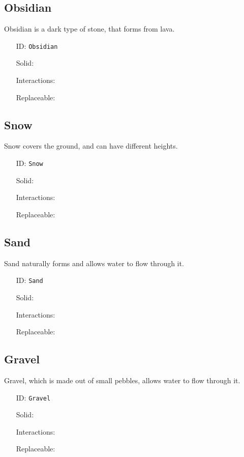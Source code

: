 \subsection{Obsidian}\label{subsec:blocks_obsidian}
Obsidian is a dark type of stone, that forms from lava.
\newline
\begin{itemize}[nosep]
\item[ID:] \texttt{Obsidian}
\item[Solid:]  \Checkmark \item[Interactions:]  \XSolidBrush \item[Replaceable:]  \XSolidBrush \end{itemize}

\subsection{Snow}\label{subsec:blocks_snow}
Snow covers the ground, and can have different heights.
\newline
\begin{itemize}[nosep]
\item[ID:] \texttt{Snow}
\item[Solid:]  \Checkmark \item[Interactions:]  \Checkmark \item[Replaceable:]  \XSolidBrush \end{itemize}

\subsection{Sand}\label{subsec:blocks_sand}
Sand naturally forms and allows water to flow through it.
\newline
\begin{itemize}[nosep]
\item[ID:] \texttt{Sand}
\item[Solid:]  \Checkmark \item[Interactions:]  \XSolidBrush \item[Replaceable:]  \XSolidBrush \end{itemize}

\subsection{Gravel}\label{subsec:blocks_gravel}
Gravel, which is made out of small pebbles, allows water to flow through it.
\newline
\begin{itemize}[nosep]
\item[ID:] \texttt{Gravel}
\item[Solid:]  \Checkmark \item[Interactions:]  \XSolidBrush \item[Replaceable:]  \XSolidBrush \end{itemize}

